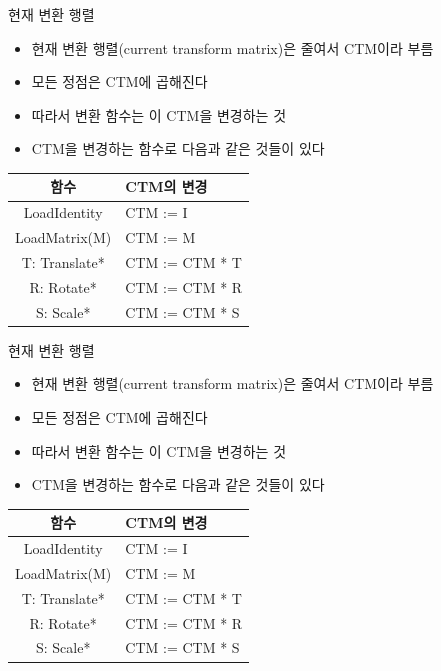 \documentclass{beamer}
\begin{document}
\begin{frame}[fragile]{현재 변환 행렬}

\begin{itemize}
\item 현재 변환 행렬(current transform matrix)은 줄여서 CTM이라 부름
\item 모든 정점은 CTM에 곱해진다
\item 따라서 변환 함수는 이 CTM을 변경하는 것
\item CTM을 변경하는 함수로 다음과 같은 것들이 있다
\end{itemize}

\begin{tabular}{|c|p{7cm}|}\hline
{\small \sf 함수 } & {\small \sf CTM의 변경}\\ \hline
{\small \sf LoadIdentity} & {\small \sf CTM := I}\\ \hline
{\small \sf LoadMatrix(M)} & {\small \sf CTM := M}\\ \hline
{\small \sf T: Translate*} & {\small \sf CTM := CTM * T}\\ \hline
{\small \sf R: Rotate*} & {\small \sf CTM := CTM * R}\\ \hline
{\small \sf S: Scale*}	& {\small \sf CTM := CTM * S}\\ \hline
\end{tabular}

\end{frame}


\begin{frame}[fragile]{현재 변환 행렬}

\begin{itemize}
\item 현재 변환 행렬(current transform matrix)은 줄여서 CTM이라 부름
\item 모든 정점은 CTM에 곱해진다
\item 따라서 변환 함수는 이 CTM을 변경하는 것
\item CTM을 변경하는 함수로 다음과 같은 것들이 있다
\end{itemize}

\begin{tabular}{|c|p{7cm}|}\hline
{\small \sf 함수 } & {\small \sf CTM의 변경}\\ \hline
{\small \sf LoadIdentity} & {\small \sf CTM := I}\\ \hline
{\small \sf LoadMatrix(M)} & {\small \sf CTM := M}\\ \hline
{\small \sf T: Translate*} & {\small \sf CTM := CTM * T}\\ \hline
{\small \sf R: Rotate*} & {\small \sf CTM := CTM * R}\\ \hline
{\small \sf S: Scale*}	& {\small \sf CTM := CTM * S}\\ \hline
\end{tabular}

\end{frame}
\end{document}
